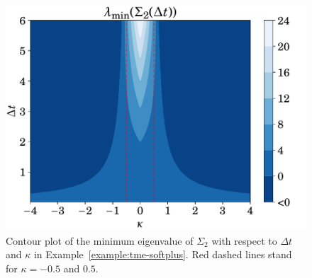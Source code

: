 \begin{figure}[t!]
	\centering
	\includegraphics[width=.7\linewidth]{figs/tme-softplus-mineigs}
	\caption{Contour plot of the minimum eigenvalue of $\Sigma_2$ with respect to $\Delta t$ and $\kappa$ in Example~\ref{example:tme-softplus}. Red dashed lines stand for $\kappa=-0.5$ and $0.5$.}
	\label{fig:tme-softplus}
\end{figure}

